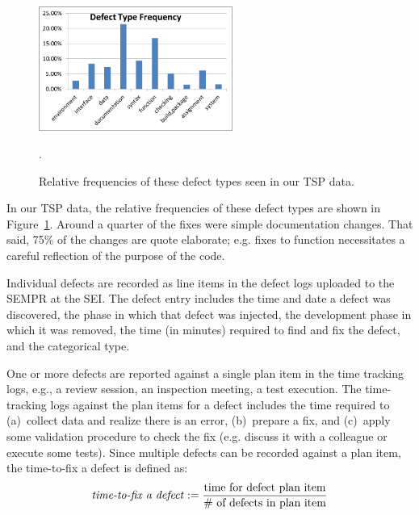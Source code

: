 \documentclass[smallcondensed]{svjour3}
\newcommand{\fig}[1]{Figure~\ref{fig:#1}}
\begin{document}
\begin{figure}[t]
\begin{center}
\includegraphics[width=2.5in]{img/defect_type_frequency.png}
\end{center}
\caption{Relative frequencies of these defect types seen in our TSP data.}\label{fig:dtypes}.
\end{figure}
In our TSP data,  the relative frequencies of these defect types are shown in \fig{dtypes}. Around a quarter of the fixes were simple documentation changes.
That said, 75\% of the changes are quote  elaborate;   e.g. fixes to function necessitates a careful reflection of the purpose of the code.

Individual defects are recorded as line items in the defect logs uploaded to the SEMPR at the SEI. The defect entry includes the time and date a defect was discovered, the phase in which that defect was injected, the development phase in which it was removed, the time (in minutes) required to find and fix the defect, and the categorical type. 

One or more defects are reported against a single plan item in the time tracking logs, e.g., a review session, an inspection meeting, a test execution. The time-tracking logs against the plan items for a defect includes the time required to (a)~collect data and realize there is an error, 
(b)~prepare a fix,  and (c)~apply some validation
procedure to check the fix (e.g. discuss it with a colleague or execute some tests).
Since multiple defects can be recorded against a plan item, the time-to-fix a defect is defined as:
\[
\text{\emph{time-to-fix a defect}} := \frac{\text{time for defect plan item}}{\text{\# of defects in plan item}}
\]
\end{document}
